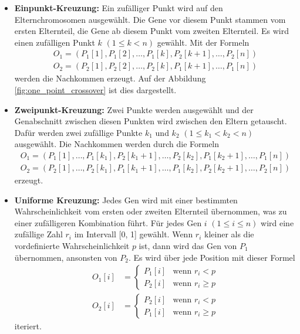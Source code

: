 \begin{itemize}
	\item \textbf{Einpunkt-Kreuzung:} Ein zufälliger Punkt wird auf den
	Elternchromosomen ausgewählt. Die Gene vor diesem Punkt stammen
	vom ersten Elternteil, die Gene ab diesem Punkt vom zweiten
	Elternteil. Es wird einen zufälligen Punkt \( k \) \((1 \leq k < n)\)
	gewählt. Mit der Formeln
	\begin{align*}
		O_1 = (P_1[1], P_1[2], \ldots, P_1[k], P_2[k+1], \ldots, P_2[n])\\
		O_2 = (P_2[1], P_2[2], \ldots, P_2[k], P_1[k+1], \ldots, P_1[n])
	\end{align*}
	werden die Nachkommen erzeugt. Auf der Abbildung \ref{fig:one_point_crossover}
	ist dies dargestellt.
	\item \textbf{Zweipunkt-Kreuzung:} Zwei Punkte werden ausgewählt und
	der Genabschnitt zwischen diesen Punkten wird zwischen den Eltern 
	getauscht. Dafür werden zwei zufällige Punkte \( k_1 \) und \( k_2 \)
	\((1 \leq k_1 < k_2 < n)\) ausgewählt. Die Nachkommen werden durch die
	Formeln
	\begin{align*}
		O_1 = (P_1[1], \ldots, P_1[k_1], P_2[k_1+1], \ldots, P_2[k_2], P_1[k_2+1], \ldots, P_1[n])\\
		O_2 = (P_2[1], \ldots, P_2[k_1], P_1[k_1+1], \ldots, P_1[k_2], P_2[k_2+1], \ldots, P_2[n])
	\end{align*}
	erzeugt.
	\item \textbf{Uniforme Kreuzung:} Jedes Gen wird mit einer bestimmten
	Wahrscheinlichkeit vom ersten oder zweiten Elternteil übernommen, was zu
	einer zufälligeren Kombination führt. Für jedes Gen \( i \) \((1 \leq i \leq n)\)
	wird eine zufällige Zahl \( r_i \) im Intervall [0, 1] gewählt. Wenn
	\( r_i \) kleiner als die vordefinierte Wahrscheinlichkeit \( p \) ist,
	dann wird das Gen von \( P_1 \) übernommen, ansonsten von \( P_2 \). Es
	wird über jede Position mit dieser Formel 
	\begin{align*}
		O_1[i] &=
		\begin{cases} 
			P_1[i] & \text{wenn } r_i < p       \\
			P_2[i] & \text{wenn } r_i \geq p 
		\end{cases}
		\\
		O_2[i] &=
		\begin{cases} 
			P_2[i] & \text{wenn } r_i < p       \\
			P_1[i] & \text{wenn } r_i \geq p 
		\end{cases}
	\end{align*}
	iteriert.
\end{itemize}

